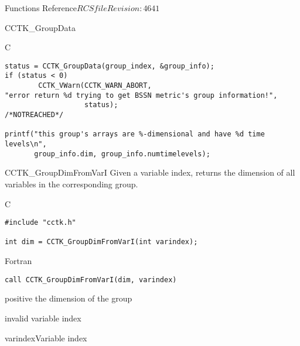 \begin{cactuspart}{ Functions Reference}{$RCSfile$}{$Revision: 4641 $}
\begin{FunctionDescription}{CCTK\_GroupData}
\begin{ExampleSection}
\begin{Example}{C}
\begin{verbatim}
status = CCTK_GroupData(group_index, &group_info);
if (status < 0)
        CCTK_VWarn(CCTK_WARN_ABORT,
"error return %d trying to get BSSN metric's group information!",
                   status);                                     /*NOTREACHED*/

printf("this group's arrays are %-dimensional and have %d time levels\n",
       group_info.dim, group_info.numtimelevels);
\end{verbatim}
\end{Example}
\end{ExampleSection}
\end{FunctionDescription}


\begin{FunctionDescription}{CCTK\_GroupDimFromVarI}
\label{CCTK-GroupDimFromVarI}
Given a variable index, returns the dimension of all variables in the corresponding group.

\begin{SynopsisSection}
\begin{Synopsis}{C}
\begin{verbatim}
#include "cctk.h"

int dim = CCTK_GroupDimFromVarI(int varindex);
\end{verbatim}
\end{Synopsis}
\begin{Synopsis}{Fortran}
\begin{verbatim}
call CCTK_GroupDimFromVarI(dim, varindex)
\end{verbatim}
\end{Synopsis}
\end{SynopsisSection}

\begin{ResultSection}
\begin{Result}{positive} the dimension of the group\end{Result}
\begin{Result}{-1} invalid variable index \end{Result}
\end{ResultSection}

\begin{ParameterSection}
\begin{Parameter}{varindex}Variable index\end{Parameter}
\end{ParameterSection}


\end{FunctionDescription}
\end{cactuspart}
